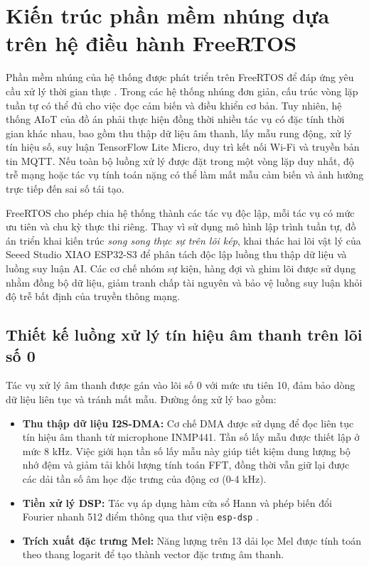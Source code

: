 
\section{Kiến trúc phần mềm nhúng dựa trên hệ điều hành FreeRTOS}

Phần mềm nhúng của hệ thống được phát triển trên FreeRTOS để đáp ứng yêu cầu xử lý thời gian thực \cite{ref_2_freertos}. Trong các hệ thống nhúng đơn giản, cấu trúc vòng lặp tuần tự có thể đủ cho việc đọc cảm biến và điều khiển cơ bản. Tuy nhiên, hệ thống AIoT của đồ án phải thực hiện đồng thời nhiều tác vụ có đặc tính thời gian khác nhau, bao gồm thu thập dữ liệu âm thanh, lấy mẫu rung động, xử lý tín hiệu số, suy luận TensorFlow Lite Micro, duy trì kết nối Wi-Fi và truyền bản tin MQTT. Nếu toàn bộ luồng xử lý được đặt trong một vòng lặp duy nhất, độ trễ mạng hoặc tác vụ tính toán nặng có thể làm mất mẫu cảm biến và ảnh hưởng trực tiếp đến sai số tái tạo.

FreeRTOS cho phép chia hệ thống thành các tác vụ độc lập, mỗi tác vụ có mức ưu tiên và chu kỳ thực thi riêng. Thay vì sử dụng mô hình lập trình tuần tự, đồ án triển khai kiến trúc \textit{song song thực sự trên lõi kép}, khai thác hai lõi vật lý của Seeed Studio XIAO ESP32-S3 để phân tách độc lập luồng thu thập dữ liệu và luồng suy luận AI. Các cơ chế nhóm sự kiện, hàng đợi và ghim lõi được sử dụng nhằm đồng bộ dữ liệu, giảm tranh chấp tài nguyên và bảo vệ luồng suy luận khỏi độ trễ bất định của truyền thông mạng.

\subsection{Thiết kế luồng xử lý tín hiệu âm thanh trên lõi số 0}

Tác vụ xử lý âm thanh được gán vào lõi số 0 với mức ưu tiên 10, đảm bảo dòng dữ liệu liên tục và tránh mất mẫu. Đường ống xử lý bao gồm:

\begin{itemize}
    \item \textbf{Thu thập dữ liệu I2S-DMA:} Cơ chế DMA được sử dụng để đọc liên tục tín hiệu âm thanh từ microphone INMP441. Tần số lấy mẫu được thiết lập ở mức 8 kHz. Việc giới hạn tần số lấy mẫu này giúp tiết kiệm dung lượng bộ nhớ đệm và giảm tải khối lượng tính toán FFT, đồng thời vẫn giữ lại được các dải tần số âm học đặc trưng của động cơ (0-4 kHz).
    \item \textbf{Tiền xử lý DSP:} Tác vụ áp dụng hàm cửa sổ Hann và phép biến đổi Fourier nhanh 512 điểm thông qua thư viện \texttt{esp-dsp} \cite{ref_2_espdsp}.
    \item \textbf{Trích xuất đặc trưng Mel:} Năng lượng trên 13 dải lọc Mel được tính toán theo thang logarit để tạo thành vector đặc trưng âm thanh.
\end{itemize}

